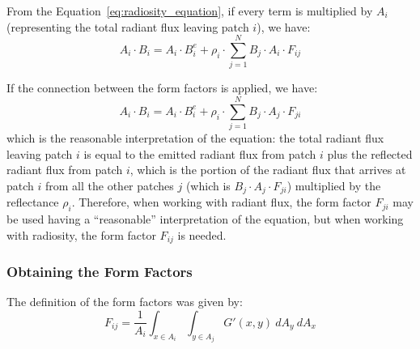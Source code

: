 From the Equation~\ref{eq:radiosity_equation}, if every term is multiplied by $A_i$ (representing the total radiant flux leaving patch $i$), we have:
\begin{equation*}
    A_i \cdot B_i = A_i \cdot B_i^e + \rho_i \cdot \sum_{j=1}^N B_j\cdot A_i \cdot F_{ij}
\end{equation*}

If the connection between the form factors is applied, we have:
\begin{equation*}
    A_i \cdot B_i = A_i \cdot B_i^e + \rho_i \cdot \sum_{j=1}^N B_j\cdot A_j \cdot F_{ji}
\end{equation*}
which is the reasonable interpretation of the equation: the total radiant flux leaving patch $i$ is equal to the emitted radiant flux from patch $i$ plus the reflected radiant flux from patch $i$, which is the portion of the radiant flux that arrives at patch $i$ from all the other patches $j$ (which is $B_j\cdot A_j\cdot F_{ji}$) multiplied by the reflectance $\rho_i$. Therefore, when working with radiant flux, the form factor $F_{ji}$ may be used having a ``reasonable'' interpretation of the equation, but when working with radiosity, the form factor $F_{ij}$ is needed.

\subsubsection{Obtaining the Form Factors}

The definition of the form factors was given by:
\begin{equation*}
    F_{ij} = \frac{1}{A_i} \int_{x\in A_i} \int_{y\in A_j} G'(x, y) \ dA_y \ dA_x
\end{equation*}

